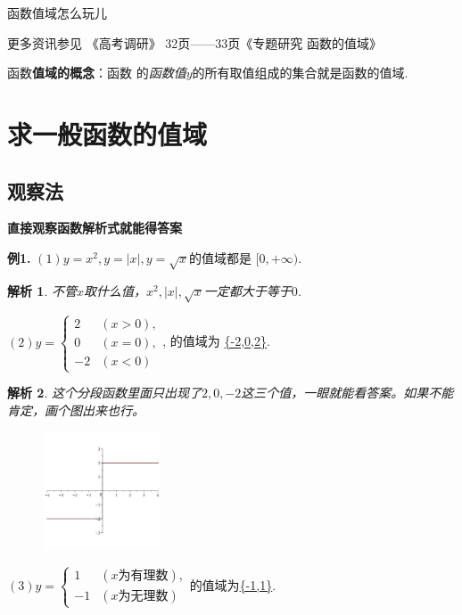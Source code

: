 \documentclass{article}
\theoremstyle{plain}
\newtheorem{aly}{解析}
\begin{document}
\centerline{\Large{函数值域怎么玩儿}}
\centerline{更多资讯参见 《高考调研》 32页——33页《专题研究  函数的值域》}
\vspace{10pt}

函数\textbf{值域的概念}：函数 的\emph{函数值}$y$的所有取值组成的集合就是函数的值域.

\section{求一般函数的值域}

\subsection{观察法}
\textbf{直接观察函数解析式就能得答案}

\textbf{例1.} $(1) y=x^2, y=|x|, y=\sqrt{x}$的值域都是 \uline{$[0,+\infty)$}.

\begin{aly}
  不管$x$取什么值，$x^2, |x|, \sqrt{x}$一定都大于等于$0$.
\end{aly}

$(2) y=\left\{ \begin{array}{ll}
                 2 & (x>0), \\
                 0  & (x=0), \\
                 -2 & (x<0)
               \end{array} \right.$, 的值域为 \uline{\{-2,0,2\}}.
\begin{aly}
  这个分段函数里面只出现了$2,0,-2$这三个值，一眼就能看答案。如果不能肯定，画个图出来也行。
    \begin{figure}[h]
     \centering
     \includegraphics[width=3.5cm]{1-2.jpg}
    \end{figure}
\end{aly}

$(3) y=\left\{ \begin{array}{ll}
                 1 & (x\textrm{为有理数}), \\
                 -1 & (x\textrm{为无理数})
               \end{array} \right.$的值域为\uline{\{-1,1\}}.
\vspace{15pt}
\end{document}
